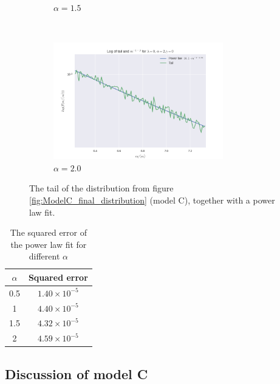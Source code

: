 \documentclass[a4paper, 10pt]{article}
\begin{document}
\begin{figure}[!ht]
\begin{subfigure}[H!]{0.5\textwidth}
        \caption{$\alpha = 1.5$}
    \end{subfigure}
     ~
    \begin{subfigure}[H!]{0.5\textwidth}
        \centering
        \includegraphics[height=2.0in]{tailL0A2G0.png}
        \caption{$\alpha = 2.0$}
    \end{subfigure}
\caption{The tail of the distribution from figure \ref{fig:ModelC_final_distribution} (model C), together with a power law fit.}\label{fig:ModelC_tail}
\end{figure} 
\begin{table}[!hb]
\centering
\caption{The squared error of the power law fit for different $\alpha$}\label{tab:Parameters_C}
\begin{tabular}{|c|c|}
\hline
$\alpha$ & Squared error\\
\hline
0.5& $1.40 \times 10^{-5}$\\
1& $4.40 \times 10^{-5}$\\
1.5 & $4.32 \times 10^{-5}$\\
2& $4.59\times 10^{-5}$\\
\hline
\end{tabular}
\end{table}
\subsection{Discussion of model C}
\end{document}
